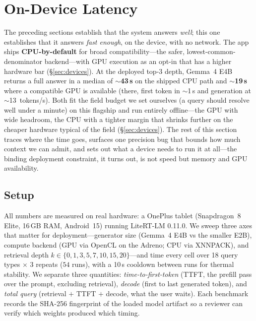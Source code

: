 \section{On-Device Latency}
\label{sec:latency}

The preceding sections establish that the system answers \emph{well}; this one
establishes that it answers \emph{fast enough}, on the device, with no network.
The app ships \textbf{CPU-by-default} for broad compatibility---the safer,
lowest-common-denominator backend---with GPU execution as an opt-in that has a
higher hardware bar (\S\ref{sec:devices}). At the deployed top-3 depth, Gemma~4
E4B returns a full answer in a median of \textbf{$\sim$43\,s} on the shipped CPU
path and \textbf{$\sim$19\,s} where a compatible GPU is available (there, first
token in $\sim$1\,s and generation at $\sim$13~tokens/s). Both fit the field budget we
set ourselves (a query should resolve well under a minute) on this flagship and
run entirely offline---the GPU with wide headroom, the CPU with a tighter margin
that shrinks further on the cheaper hardware typical of the field
(\S\ref{sec:devices}). The
rest of this section traces where the time goes, surfaces one precision bug that
bounds how much context we can admit, and sets out what a device needs to run it
at all---the binding deployment constraint, it turns out, is not speed but
memory and GPU availability.

\subsection{Setup}
\label{sec:latency-setup}

All numbers are measured on real hardware: a OnePlus tablet (Snapdragon~8
Elite, 16\,GB RAM, Android~15) running LiteRT-LM 0.11.0. We sweep three axes
that matter for deployment---generator size (Gemma~4 E4B vs the smaller E2B),
compute backend (GPU via OpenCL on the Adreno; CPU via XNNPACK), and retrieval
depth $k\in\{0,1,3,5,7,10,15,20\}$---and time every cell over 18 query types
$\times$ 3 repeats ($54$ runs), with a 10\,s cooldown between runs for thermal
stability. We separate three quantities: \emph{time-to-first-token} (TTFT, the
prefill pass over the prompt, excluding retrieval), \emph{decode} (first to
last generated token), and \emph{total query} (retrieval $+$ TTFT $+$ decode,
what the user waits). Each benchmark records the SHA-256 fingerprint of the
loaded model artifact so a reviewer can verify which weights produced which
timing.

